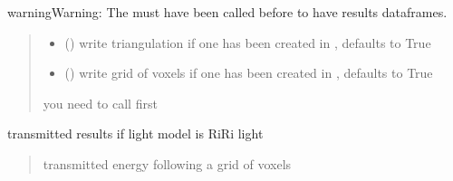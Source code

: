 \documentclass[letterpaper,10pt,english]{sphinxmanual}
\begin{document}
\begin{fulllineitems}
\begin{fulllineitems}
\begin{sphinxadmonition}{warning}{Warning:}
\sphinxAtStartPar
The {\hyperref[\detokenize{reference:LVM.LightVegeManager.run}]{}} must have been called before to have results dataframes.
\end{sphinxadmonition}
\begin{quote}\begin{description}
\begin{itemize}
\item {} 
\sphinxAtStartPar
{} (\sphinxstyleliteralemphasis{\sphinxupquote{, }}) \textendash{} write triangulation if one has been created in {\hyperref[\detokenize{reference:LVM.LightVegeManager.build}]{}}, defaults to True

\item {} 
\sphinxAtStartPar
{} (\sphinxstyleliteralemphasis{\sphinxupquote{, }}) \textendash{} write grid of voxels if one has been created in {\hyperref[\detokenize{reference:LVM.LightVegeManager.build}]{}}, defaults to True

\end{itemize}

\sphinxAtStartPar
{} \textendash{} you need to call {\hyperref[\detokenize{reference:LVM.LightVegeManager.run}]{}} first

\end{description}\end{quote}

\end{fulllineitems}


\begin{fulllineitems}
\label{\detokenize{reference:LVM.LightVegeManager.riri5_transmitted_light}}
\pysigstartsignatures
{}
\pysigstopsignatures
\sphinxAtStartPar
transmitted results if light model is RiRi light
\begin{quote}\begin{description}
\sphinxAtStartPar
transmitted energy following a grid of voxels


\end{description}
\end{quote}
\end{fulllineitems}
\end{fulllineitems}
\end{document}

